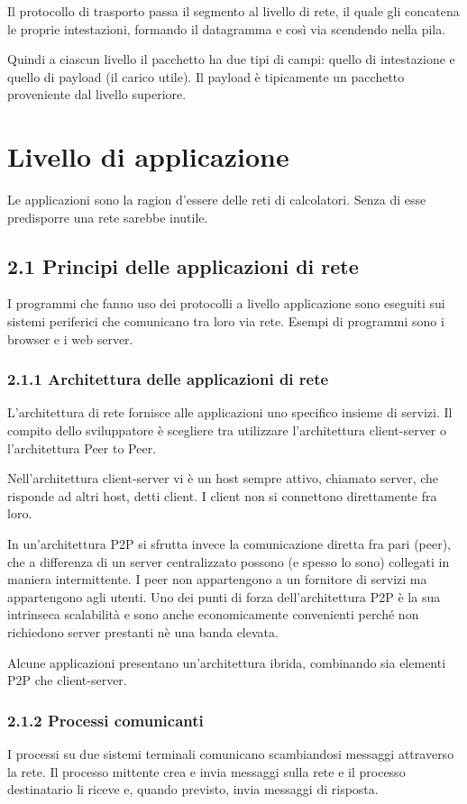 \documentclass{book}
\begin{document}
Il protocollo di trasporto passa il segmento al livello di rete, il quale gli concatena le proprie intestazioni, formando il datagramma e così via scendendo nella pila.

Quindi a ciascun livello il pacchetto ha due tipi di campi: quello di intestazione e quello di payload (il carico utile). Il payload è tipicamente un pacchetto proveniente dal livello superiore.

\chapter{Livello di applicazione}
Le applicazioni sono la ragion d'essere delle reti di calcolatori. Senza di esse predisporre una rete sarebbe inutile.

\section*{2.1 Principi delle applicazioni di rete}
I programmi che fanno uso dei protocolli a livello applicazione sono eseguiti sui sistemi periferici che comunicano tra loro via rete. Esempi di programmi sono i browser e i web server.

\subsection*{2.1.1 Architettura delle applicazioni di rete}
L'architettura di rete fornisce alle applicazioni uno specifico insieme di servizi. Il compito dello sviluppatore è scegliere tra utilizzare l'architettura client-server o l'architettura Peer to Peer.

Nell'architettura client-server vi è un host sempre attivo, chiamato server, che risponde ad altri host, detti client. I client non si connettono direttamente fra loro.

In un'architettura P2P si sfrutta invece la comunicazione diretta fra pari (peer), che a differenza di un server centralizzato possono (e spesso lo sono) collegati in maniera intermittente. I peer non appartengono a un fornitore di servizi ma appartengono agli utenti. Uno dei punti di forza dell'architettura P2P è la sua intrinseca scalabilità e sono anche economicamente convenienti perché non richiedono server prestanti nè una banda elevata.

Alcune applicazioni presentano un'architettura ibrida, combinando sia elementi P2P che client-server.

\subsection*{2.1.2 Processi comunicanti}
I processi su due sistemi terminali comunicano scambiandosi messaggi attraverso la rete. Il processo mittente crea e invia messaggi sulla rete e il processo destinatario li riceve e, quando previsto, invia messaggi di risposta.
\end{document}
